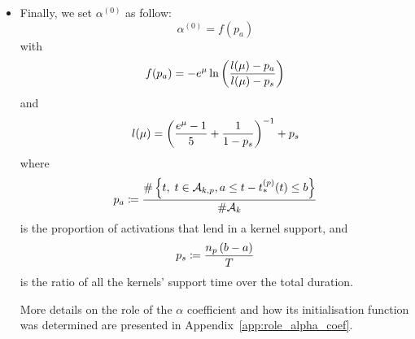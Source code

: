 \begin{itemize}
    \item Finally, we set $\alpha^{(0)}$ as follow:
    \begin{equation}
    \alpha^{(0)} = f(p_a)
    \end{equation}
    with
    \begin{equation}
        f(p_a) = - e^{\mu} \ln\left( \frac{l(\mu) - p_a}{l(\mu)  - p_s} \right)
    \end{equation}
    and
    \begin{equation}
        l(\mu) = \left( \frac{e^{\mu}-1}{5} + \frac{1}{1-p_s} \right)^{-1} + p_s
    \end{equation}
    where
    \begin{equation}
        p_a \coloneqq \frac{\#\left\lbrace t,\; t\in\mathcal{A}_{k,p}, a\leq t-t_*^{(p)}(t)\leq b \right\rbrace}{\#\mathcal{A}_k}
    \end{equation}
    is the proportion of activations that lend in a kernel support, and 
    \begin{equation}
        p_s \coloneqq \frac{n_p\left( b-a \right)}{T}
    \end{equation}
    is the ratio of all the kernels' support time over the total duration.
    
    More details on the role of the $\alpha$ coefficient and how its initialisation function was determined are presented in Appendix~\ref{app:role_alpha_coef}.
    
\end{itemize}




